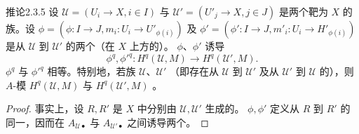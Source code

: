 \begin{SGAresult}{推论}{2.3.5}
设 $\mathcal U=(U_i\to X,i\in I)$ 与 $\mathcal U'=(U'_j\to X,j\in J)$ 是两个靶为 $X$ 的族。设
$\phi=(\phi:I\to J,m_i:U_i\to U'_{\phi(i)})$ 及
$\phi'=(\phi':I\to J,m'_i:U_i\to H'_{\phi(i)})$ 是从 $\mathcal U$ 到 $\mathcal U'$ 的两个（在 $X$ 上方的）。 $\phi$、$\phi'$ 诱导
\[
 \phi^q,\phi'^q:H^q(\mathcal U,M)\longrightarrow H^q(\mathcal U',M).
\]
$\phi^q$ 与 $\phi'^q$ 相等。特别地，若族 $\mathcal U$、$\mathcal U'$ （即存在从 $\mathcal U$ 到 $\mathcal U'$ 及从 $\mathcal U'$ 到 $\mathcal U$ 的），则 $A$-模 $H^q(\mathcal U,M)$ 与 $H^q(\mathcal U',M)$ 。
\end{SGAresult}
\begin{proof}
事实上，设 $R,R'$ 是 $X$ 中分别由 $\mathcal U,\mathcal U'$ 生成的。 $\phi,\phi'$ 定义从 $R$ 到 $R'$ 的同一，因而在 $A_{\mathcal U\bullet}$ 与 $A_{\mathcal U'\bullet}$ 之间诱导两个。
\end{proof}
